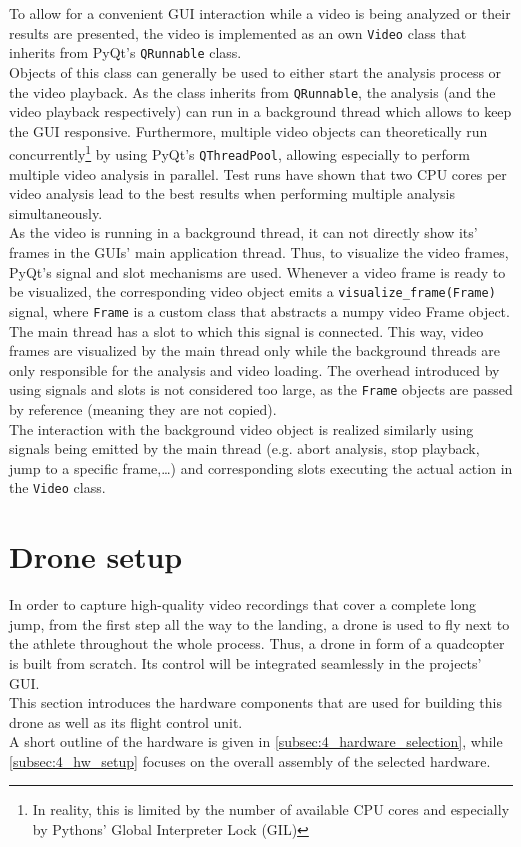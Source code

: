 \noindent To allow for a convenient \ac{GUI} interaction while a video is
being analyzed or their results are presented, the video is implemented as an
own \texttt{Video} class that inherits from PyQt's \texttt{QRunnable} class.\\
Objects of this class can generally be used to either start the analysis
process or the video playback.
As the class inherits from \texttt{QRunnable}, the analysis (and the video
playback respectively) can run in a background thread which allows to keep the
\ac{GUI} responsive.
Furthermore, multiple video objects can theoretically run
concurrently\footnote{In reality, this is limited by the number of available
\ac{CPU} cores and especially by Pythons' Global Interpreter Lock (GIL)} by
using PyQt's \texttt{QThreadPool}, allowing especially to perform multiple
video analysis in parallel.
Test runs have shown that two \ac{CPU} cores per video analysis lead to the
best results when performing multiple analysis simultaneously.\\
As the video is running in a background thread, it can not directly show its'
frames in the \ac{GUI}s' main application thread.
Thus, to visualize the video frames, PyQt's signal and slot mechanisms are
used.
Whenever a video frame is ready to be visualized, the corresponding video
object emits a \texttt{visualize\_frame(Frame)} signal, where \texttt{Frame}
is a custom class that abstracts a numpy video Frame object.
The main thread has a slot to which this signal is connected.
This way, video frames are visualized by the main thread only while the
background threads are only responsible for the analysis and video loading.
The overhead introduced by using signals and slots is not considered too
large, as the \texttt{Frame} objects are passed by reference (meaning they
are not copied).\\
The interaction with the background video object is realized similarly using
signals being emitted by the main thread (e.g. abort analysis, stop playback,
jump to a specific frame,\ldots) and corresponding slots executing the actual
action in the \texttt{Video} class.


\section{Drone setup}\label{sec:4_hardware}
In order to capture high-quality video recordings that cover a complete long 
jump, from the first step all the way to the landing, a drone is used to fly
next to the athlete throughout the whole process.
Thus, a drone in form of a quadcopter is built from scratch.
Its control will be integrated seamlessly in the projects' \ac{GUI}.\\
This section introduces the hardware components that are used for building 
this drone as well as its flight control unit.\\
A short outline of the hardware is given in 
\autoref{subsec:4_hardware_selection},
while \autoref{subsec:4_hw_setup} focuses on the overall assembly of the 
selected hardware.

